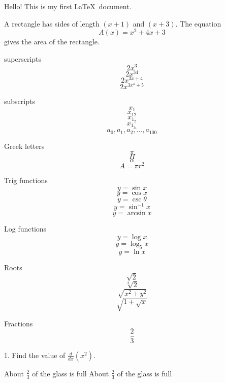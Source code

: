 \documentclass[11pt]{article}
\begin{document}
Hello! This is my first \LaTeX\ document.

A rectangle has sides of length $(x+1)$ and $(x+3)$.
The equation $${A(x)=x^2+4x+3}$$ gives the area of the rectangle.

superscripts $$2x^3$$
$$2x^{34}$$
$$2x^{3x+4}$$
$$2x^{3x^4+5}$$

subscripts
$$x_1$$
$$x_{12}$$
$$x_{1_2}$$
$$x_{1_{2_3}}$$
$$a_0, a_1, a_2, \ldots, a_{100}$$

Greek letters
$$\pi$$
$$\Pi$$
$$\alpha$$
$$A=\pi r^2$$

Trig functions
$$y=\sin x$$
$$y=\cos x$$
$$y=\csc \theta$$
$$y=\sin^{-1} x$$
$$y=\arcsin x$$

Log functions
$$y=\log x$$
$$y=\log_5 x$$
$$y=\ln x$$

Roots
$$\sqrt{2}$$
$$\sqrt[3]{2}$$
$$\sqrt{x^2+y^2}$$
$$\sqrt{1+\sqrt{x}}$$

Fractions
$$\frac{2}{3}$$

1. Find the value of $\frac{d}{dx}(x^2).$

About $\displaystyle \frac{2}{3}$ of the glass is full
About $\frac{2}{3}$ of the glass is full
\end{document}
